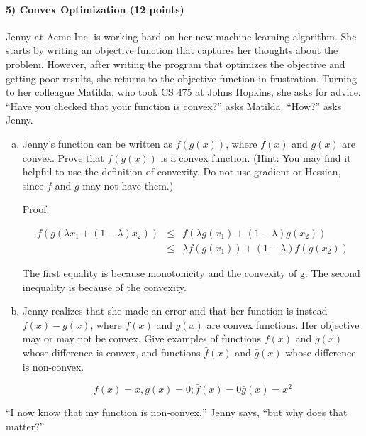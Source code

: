 \documentclass[11pt]{article}
\begin{document}
\paragraph{5) Convex Optimization (12 points)}
Jenny at Acme Inc. is working hard on her new machine learning algorithm. She starts by writing an objective function
that captures her thoughts about the problem. However, after writing the program that optimizes the objective
and getting poor results, she returns to the objective function in frustration. Turning to her colleague Matilda,
who took CS 475 at Johns Hopkins, she asks for advice. ``Have you checked that your function is convex?'' asks Matilda.
``How?'' asks Jenny.
\begin{enumerate}[(a)]
\item Jenny's function can be written as $f(g(x))$, where $f(x)$ and $g(x)$ are convex. Prove that $f(g(x))$ is a convex function. (Hint: You may find it helpful to use the definition of convexity. Do not use gradient or Hessian, since $f$ and $g$ may not have them.)

Proof:

\begin{eqnarray*}
f(g(\lambda x_1 + (1-\lambda) x_2)) &\le& f(\lambda g(x_1) + (1 - \lambda) g(x_2))\\
&\le& \lambda f(g(x_1)) + (1 - \lambda) f(g(x_2))
\end{eqnarray*}

The first equality is because monotonicity and the convexity of g. The second inequality is because of the convexity.

\item Jenny realizes that she made an error and that her function is instead
$f(x)-g(x)$, where $f(x)$ and $g(x)$ are convex functions. Her objective may or may not be convex. Give examples of functions $f(x)$ and $g(x)$ whose difference is convex, and functions $\bar{f}(x)$ and $\bar{g}(x)$ whose difference is non-convex.

$$f(x) = x, g(x) =  0; \bar f(x) = 0 \bar g(x) = x^2 $$
\end{enumerate}
``I now know that my function is non-convex,'' Jenny says, ``but why does that matter?''
\end{document}
